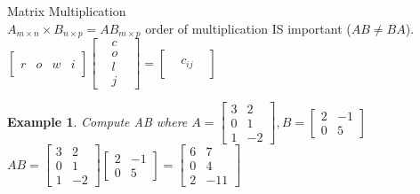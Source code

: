 \documentclass[a4paper,12pt,openany]{book}
\theoremstyle{defn}
\theoremstyle{expl}
\newtheorem{expl}{Example}[section]
\begin{document}
\noindent Matrix Multiplication\\
$A_{m\times n} \times B_{n\times p} = AB_{m\times p}$ order of multiplication IS important ($AB \neq BA$).\\
$\left[\begin{array}{cccc}&&&\\r&o&w&i\\&&&\end{array}\right]\left[\begin{array}{ccc}&c&\\&o&\\&l&\\&j&\end{array}\right]=\left[\begin{array}{ccc}&&\\&c_{ij}&\\&&\end{array}\right]$\\
\begin{expl}
\textup{Compute AB where $A = \left[\begin{array}{cc}3&2\\0&1\\1&-2\end{array}\right], B = \left[\begin{array}{cc}2&-1\\0&5\end{array}\right]$}\\
$AB=\left[\begin{array}{cc}3&2\\0&1\\1&-2\end{array}\right]\left[\begin{array}{cc}2&-1\\0&5\end{array}\right]=\left[\begin{array}{cc}6&7\\0&4\\2&-11\end{array}\right]$
\end{expl}
\end{document}

